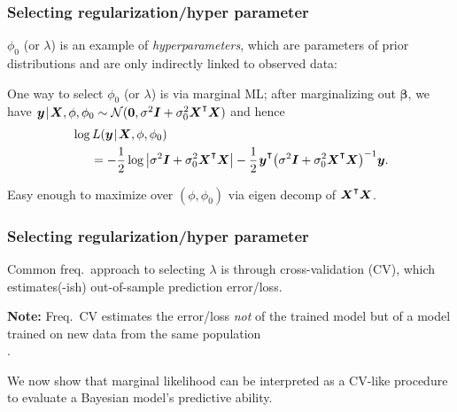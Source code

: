 \documentclass[18pt, handout]{beamer}
\newcommand{\defineTightSpacing}{%
	\setlength{\abovedisplayskip}{.25\baselineskip}%
	\setlength{\belowdisplayskip}{.25\baselineskip}%
}
\renewcommand{\textsc}[1]{{\small \MakeUppercase{#1}}}
\newcommand{\given}{\thinnerspace | \thinnerspace}
\newcommand{\transpose}{\text{\raisebox{.5ex}{$\intercal$}}}
\newcommand{\thinnerspace}{\mskip.5\thinmuskip}
\newcommand{\normalDist}{\mathcal{N}}
\newcommand{\likelihood}{L}
\newcommand{\by}{\bm{y}}
\newcommand{\bX}{\bm{X}}
\newcommand{\bbeta}{\bm{\beta}}
\newcommand{\Id}{\bm{I}}
\begin{document}
\begin{frame}
\frametitle{Selecting regularization/hyper parameter}
$\phi_0$ (or $\lambda$) is an example of \textit{hyperparameters}, which are parameters of prior distributions and are only indirectly linked to observed data:%
\vspace*{-.3\baselineskip}
\begin{figure} 
\end{figure}
\vspace*{-.7\baselineskip}

One way to select $\phi_0$ (or $\lambda$) is via marginal \textsc{ML};
after marginalizing out $\bbeta$, we have $\thinnerspace \by \given \bX, \phi, \phi_0 \sim \normalDist(\bm{0}, \sigma^2 \Id + \sigma_0^2 \bX^\transpose \bX)$ and hence
\begin{equation*} \defineTightSpacing%
\begin{aligned}
&\log \likelihood(\by \given \bX, \phi, \phi_0)\\
&\hspace*{1.5em}= - \frac12 \log \left| \sigma^2 \Id + \sigma_0^2 \bX^\transpose \bX \right|
	- \frac12 \thinnerspace \by^\transpose \! \left( \sigma^2 \Id + \sigma_0^2 \bX^\transpose \bX \right)^{-1}\! \by.
\end{aligned}
\end{equation*}

Easy enough to maximize over $(\phi, \phi_0)$ via eigen decomp of $\bX^\transpose \bX$.
\end{frame}


\begin{frame}
\frametitle{Selecting regularization/hyper parameter}
Common freq.\ approach to selecting $\lambda$ is through cross-validation (\textsc{CV}), which estimates(-ish) out-of-sample prediction error/loss.

\smallskip
\textbf{Note:} Freq.\ \textsc{CV} estimates the error/loss \textit{not} of the trained model but of a model trained on new data from the same population\\
\hfill \citep{hastie2009esl, bates2023cross_validation}.

\smallskip
We now show that marginal likelihood can be interpreted as a \textsc{CV}-like procedure to evaluate a Bayesian model's predictive ability.
\end{frame}
\end{document}
